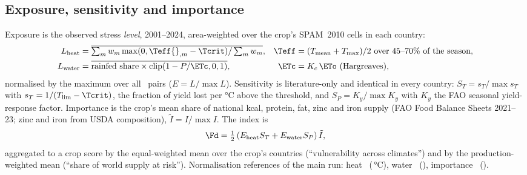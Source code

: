 \subsection{Exposure, sensitivity and importance}
Exposure is the observed stress \emph{level}, 2001--2024, area-weighted over the crop's SPAM~2010 cells
in each country:
\begin{align*}
L_{\text{heat}} &= \overline{\textstyle\sum_m w_m \max(0, \Teff{}_{,m}-\Tcrit)/\sum_m w_m}, &
\Teff &= (T_{\text{mean}}+T_{\max})/2 \text{ over 45--70\% of the season},\\
L_{\text{water}} &= \overline{\text{rainfed share}\times\operatorname{clip}(1-P/\ETc,0,1)}, &
\ETc &= K_c\,\ETo~(\text{Hargreaves}),
\end{align*}
normalised by the maximum over all \nPairs\ pairs ($E = L/\max L$). Sensitivity is literature-only and
identical in every country: $S_T = s_T/\max s_T$ with $s_T = 1/(T_{\lim}-\Tcrit)$, the fraction of yield
lost per \si{\celsius} above the threshold, and $S_P = K_y/\max K_y$ with $K_y$ the FAO seasonal yield-response
factor. Importance is the crop's mean share of national kcal, protein, fat, zinc and iron supply (FAO
Food Balance Sheets 2021--23; zinc and iron from USDA composition), $\tilde I = I/\max I$. The index is
\[
\Fd = \tfrac12\left(E_{\text{heat}}S_T + E_{\text{water}}S_P\right)\tilde I ,
\]
aggregated to a crop score by the equal-weighted mean over the crop's countries (``vulnerability across
climates'') and by the production-weighted mean (``share of world supply at risk'').
Normalisation references of the main run: heat \ (\,\si{\celsius}), water
\ (), importance \ ().

